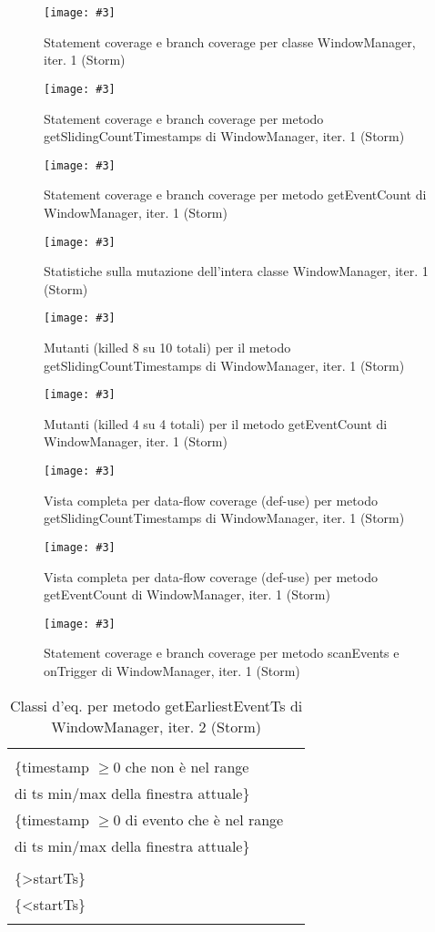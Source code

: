 \documentclass[10pt, a4paper]{article}
\newcommand{\Intmaketable}[4]{
	\begin{longtable}{#3}
	#4
	\caption{#2}
	\label{#1}
	\end{longtable}
}
\newcommand{\Intceqtable}[3]{
	\Intmaketable{#1}{#2}{|l|l|}{
	\hline
	\thead{Parametro formale} & \thead{Classi d'equivalenza} \\
	\hline
	\hline
	#3
	\hline}
}
\newcommand{\Intceqcaption}[4]{Classi d'eq. per metodo #1 di #2, iter. #3 (#4)}
\newcommand{\gettablelabel}[5]{table:#1:#2:#3:iter#4:proj#5}
\newcommand{\ceqtable}[5]{
	\Intceqtable{\gettablelabel{ceq}{#1}{#2}{#3}{#4}}
		{\Intceqcaption{#1}{#2}{#3}{#4}}
		{#5}
}
\newcommand{\getpicturelabel}[1]{picture:#1}
\newcommand{\makepicture}[4]{
	\begin{figure}[H]
	\centering
	\texttt{[image: \#3]}
	\caption{#4}
	\label{\getpicturelabel{#3}}
	\end{figure}
}
\newcommand{\alldfcovcaption}[4]{Vista completa per data-flow coverage (def-use) per metodo #1 di #2, iter. #3 (#4)}
\newcommand{\methodcfcovcaption}[4]{Statement coverage e branch coverage per metodo #1 di #2, iter. #3 (#4)}
\newcommand{\classcfcovcaption}[3]{Statement coverage e branch coverage per classe #1, iter. #2 (#3)}
\newcommand{\mutclasscaption}[3]{Statistiche sulla mutazione dell'intera classe #1, iter. #2 (#3)}
\newcommand{\mutmethodcaption}[6]{Mutanti (killed #5 su #6 totali) per il metodo #1 di #2, iter. #3 (#4)}
\newcommand{\tcell}{\makecell[tl]}
\newcommand{\newtrow}{\\ \hline}
\def\storm{Storm}
\newcommand{\ceq}[1]{\{#1\}}
\begin{document}
	\makepicture{17.5cm}{1.1cm}{storm/controlflow-WindowManager-1}
				{\classcfcovcaption{WindowManager}{1}{\storm}}
				
	\makepicture{17cm}{0.75cm}{storm/controlflow-getSlidingCountTimestamps-WindowManager-1}
				{\methodcfcovcaption{getSlidingCountTimestamps}{WindowManager}{1}{\storm}}
				
	\makepicture{17cm}{0.75cm}{storm/controlflow-getEventCount-WindowManager-1}
				{\methodcfcovcaption{getEventCount}{WindowManager}{1}{\storm}}
				
	\makepicture{17cm}{1.5cm}{storm/mutation-WindowManager-1}
				{\mutclasscaption{WindowManager}{1}{\storm}}
				
	\makepicture{17cm}{7cm}{storm/mutation-getSlidingCountTimestamps-WindowManager-1}
				{\mutmethodcaption{getSlidingCountTimestamps}{WindowManager}{1}{\storm}{8}{10}}
	
	\makepicture{11cm}{4cm}{storm/mutation-getEventCount-WindowManager-1}
				{\mutmethodcaption{getEventCount}{WindowManager}{1}{\storm}{4}{4}}
				
	\makepicture{13cm}{15cm}{storm/dataflow-getSlidingCountTimestamps-WindowManager-1}
				{\alldfcovcaption{getSlidingCountTimestamps}{WindowManager}{1}{\storm}}
				
	\makepicture{12cm}{6cm}{storm/dataflow-getEventCount-WindowManager-1}
				{\alldfcovcaption{getEventCount}{WindowManager}{1}{\storm}}
				
	\makepicture{17cm}{1.75cm}{storm/controlflow-missingmethods-WindowManager-1}
				{\methodcfcovcaption{scanEvents e onTrigger}{WindowManager}{1}{\storm}}
	
	
	\ceqtable{getEarliestEventTs}{WindowManager}{2}{\storm}{
			\tcell{startTs} &
			\tcell{
				\ceq{$< 0$}\\
				\ceq{timestamp $\ge 0$ che non è nel range\\ di ts min/max della finestra attuale}\\
				\ceq{timestamp $\ge 0$ di evento che è nel range\\ di ts min/max della finestra attuale}}
		\newtrow
			\tcell{endTs} &
			\tcell{\ceq{=startTs}\\\ceq{>startTs}\\\ceq{<startTs}}
		\newtrow
	}
	
\end{document}
